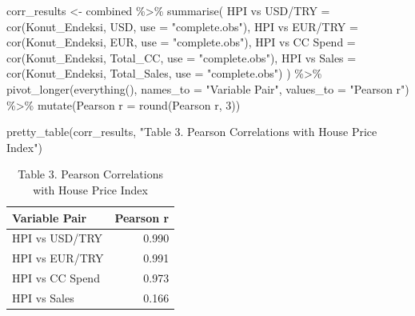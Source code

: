 \documentclass[
  11pt,
  a4paper,
  DIV=11,
  numbers=noendperiod]{scrartcl}
\newenvironment{Shaded}{\begin{snugshade}}{\end{snugshade}}
\newcommand{\AttributeTok}[1]{\textcolor[rgb]{0.40,0.45,0.13}{#1}}
\newcommand{\DecValTok}[1]{\textcolor[rgb]{0.68,0.00,0.00}{#1}}
\newcommand{\FunctionTok}[1]{\textcolor[rgb]{0.28,0.35,0.67}{#1}}
\newcommand{\NormalTok}[1]{\textcolor[rgb]{0.00,0.23,0.31}{#1}}
\newcommand{\OtherTok}[1]{\textcolor[rgb]{0.00,0.23,0.31}{#1}}
\newcommand{\SpecialCharTok}[1]{\textcolor[rgb]{0.37,0.37,0.37}{#1}}
\newcommand{\StringTok}[1]{\textcolor[rgb]{0.13,0.47,0.30}{#1}}
\begin{document}
\begin{Shaded}
\begin{Highlighting}[]
\NormalTok{corr\_results }\OtherTok{\textless{}{-}}\NormalTok{ combined }\SpecialCharTok{\%\textgreater{}\%}
  \FunctionTok{summarise}\NormalTok{(}
    \StringTok{\textasciigrave{}}\AttributeTok{HPI vs USD/TRY}\StringTok{\textasciigrave{}} \OtherTok{=} \FunctionTok{cor}\NormalTok{(Konut\_Endeksi, USD, }\AttributeTok{use =} \StringTok{"complete.obs"}\NormalTok{),}
    \StringTok{\textasciigrave{}}\AttributeTok{HPI vs EUR/TRY}\StringTok{\textasciigrave{}} \OtherTok{=} \FunctionTok{cor}\NormalTok{(Konut\_Endeksi, EUR, }\AttributeTok{use =} \StringTok{"complete.obs"}\NormalTok{),}
    \StringTok{\textasciigrave{}}\AttributeTok{HPI vs CC Spend}\StringTok{\textasciigrave{}} \OtherTok{=} \FunctionTok{cor}\NormalTok{(Konut\_Endeksi, Total\_CC, }\AttributeTok{use =} \StringTok{"complete.obs"}\NormalTok{),}
    \StringTok{\textasciigrave{}}\AttributeTok{HPI vs Sales}\StringTok{\textasciigrave{}} \OtherTok{=} \FunctionTok{cor}\NormalTok{(Konut\_Endeksi, Total\_Sales, }\AttributeTok{use =} \StringTok{"complete.obs"}\NormalTok{)}
\NormalTok{  ) }\SpecialCharTok{\%\textgreater{}\%}
  \FunctionTok{pivot\_longer}\NormalTok{(}\FunctionTok{everything}\NormalTok{(), }\AttributeTok{names\_to =} \StringTok{"Variable Pair"}\NormalTok{, }\AttributeTok{values\_to =} \StringTok{"Pearson r"}\NormalTok{) }\SpecialCharTok{\%\textgreater{}\%}
  \FunctionTok{mutate}\NormalTok{(}\StringTok{\textasciigrave{}}\AttributeTok{Pearson r}\StringTok{\textasciigrave{}} \OtherTok{=} \FunctionTok{round}\NormalTok{(}\StringTok{\textasciigrave{}}\AttributeTok{Pearson r}\StringTok{\textasciigrave{}}\NormalTok{, }\DecValTok{3}\NormalTok{))}

\FunctionTok{pretty\_table}\NormalTok{(corr\_results, }\StringTok{"Table 3. Pearson Correlations with House Price Index"}\NormalTok{)}
\end{Highlighting}
\end{Shaded}

\begin{longtable}[t]{lr}
\caption{\label{tab:corr-table}Table 3. Pearson Correlations with House Price Index}\\
\toprule
Variable Pair & Pearson r\\
\midrule
HPI vs USD/TRY & 0.990\\
HPI vs EUR/TRY & 0.991\\
HPI vs CC Spend & 0.973\\
HPI vs Sales & 0.166\\
\bottomrule
\end{longtable}
\end{document}
